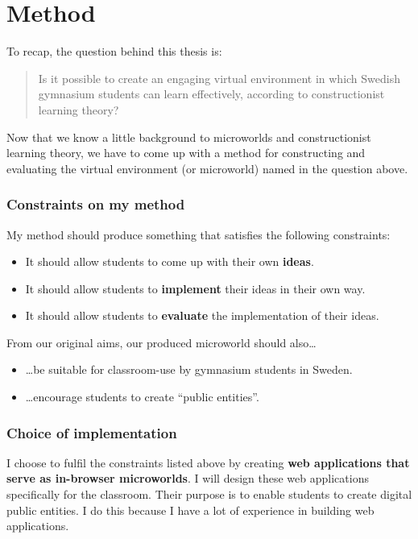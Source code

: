 \chapter{Method}

To recap, the question behind this thesis is:
\begin{quote}
Is it possible to create an engaging virtual environment in which Swedish gymnasium students can learn effectively, according to constructionist learning theory?
\end{quote}

Now that we know a little background to microworlds and constructionist learning theory, we have to come up with a method for constructing and evaluating the virtual environment (or microworld) named in the question above.

\subsection{Constraints on my method}

My method should produce something that satisfies the following constraints:
\begin{itemize}
  \item It should allow students to come up with their own \textbf{ideas}.
  \item It should allow students to \textbf{implement} their ideas in their own way.
  \item It should allow students to \textbf{evaluate} the implementation of their ideas.
\end{itemize}

From our original aims, our produced microworld should also\ldots
\begin{itemize}
  \item \ldots be suitable for classroom-use by gymnasium students in Sweden.
  \item \ldots encourage students to create ``public entities''.
\end{itemize}

\subsection{Choice of implementation}

I choose to fulfil the constraints listed above by creating \textbf{web applications that serve as in-browser microworlds}. I will design these web applications specifically for the classroom. Their purpose is to enable students to create digital public entities. I do this because I have a lot of experience in building web applications.

